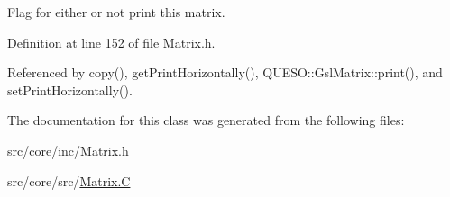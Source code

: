 Flag for either or not print this matrix. 



Definition at line 152 of file Matrix.\-h.



Referenced by copy(), get\-Print\-Horizontally(), Q\-U\-E\-S\-O\-::\-Gsl\-Matrix\-::print(), and set\-Print\-Horizontally().



The documentation for this class was generated from the following files\-:\begin{DoxyCompactItemize}
\item 
src/core/inc/\hyperlink{_matrix_8h}{Matrix.\-h}\item 
src/core/src/\hyperlink{_matrix_8_c}{Matrix.\-C}\end{DoxyCompactItemize}
